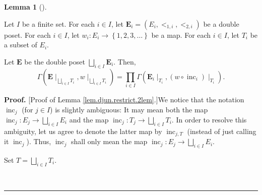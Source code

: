 \documentclass[numbers=enddot,12pt,final,onecolumn,notitlepage,abstracton]{scrartcl}
\theoremstyle{definition}
\newtheorem{lem}[theo]{Lemma}
\newenvironment{lemma}[1][]
{\begin{lem}[#1]\begin{leftbar}}
{\end{leftbar}\end{lem}}
\newenvironment{proof}[1][Proof]{\noindent\textbf{#1.} }{\ \rule{0.5em}{0.5em}}
\let\prodnonlimits\prod
\renewcommand{\prod}{\prodnonlimits\limits}
\newenvironment{verlong}{}{}
\begin{document}
\begin{verlong}
\begin{footnotesize}
\begin{lemma}
\label{lem.djun.restrict.2lem}Let $I$ be a finite set. For each $i\in I$, let
$\mathbf{E}_{i}=\left(  E_{i},<_{1,i},<_{2,i}\right)  $ be a double poset. For
each $i\in I$, let $w_{i}:E_{i}\rightarrow\left\{  1,2,3,\ldots\right\}  $ be
a map. For each $i\in I$, let $T_{i}$ be a subset of $E_{i}$.

Let $\mathbf{E}$ be the double poset $\bigsqcup_{i\in I}\mathbf{E}_{i}$. Then,%
\[
\Gamma\left(  {\mathbf{E}}\mid_{\bigsqcup_{i\in I}T_{i}},w\mid_{\bigsqcup
_{i\in I}T_{i}}\right)  =\prod_{i\in I}\Gamma\left(  \mathbf{E}_{i}\mid
_{T_{i}},\left(  w\circ\operatorname*{inc}\nolimits_{i}\right)  \mid_{T_{i}%
}\right)  .
\]

\end{lemma}

\begin{proof}
[Proof of Lemma \ref{lem.djun.restrict.2lem}.]We notice that the notation
$\operatorname*{inc}\nolimits_{j}$ (for $j\in I$) is slightly ambiguous: It
may mean both the map $\operatorname*{inc}\nolimits_{j}:E_{j}\rightarrow
\bigsqcup_{i\in I}E_{i}$ and the map $\operatorname*{inc}\nolimits_{j}%
:T_{j}\rightarrow\bigsqcup_{i\in I}T_{i}$. In order to resolve this ambiguity,
let us agree to denote the latter map by $\operatorname*{inc}\nolimits_{j,T}$
(instead of just calling it $\operatorname*{inc}\nolimits_{j}$). Thus,
$\operatorname*{inc}\nolimits_{j}$ shall only mean the map
$\operatorname*{inc}\nolimits_{j}:E_{j}\rightarrow\bigsqcup_{i\in I}E_{i}$.

Set $T=\bigsqcup_{i\in I}T_{i}$.


\end{proof}
\end{footnotesize}
\end{verlong}
\end{document}
